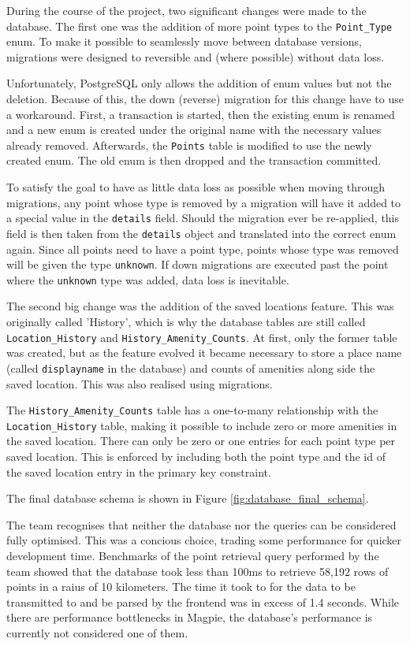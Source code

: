 During the course of the project, two significant changes were made to the
database. The first one was the addition of more point types to the
\texttt{Point\_Type} enum. To make it possible to seamlessly move between
database versions, migrations were designed to reversible and (where possible)
without data loss.

Unfortunately, PostgreSQL only allows the addition of enum values but not the
deletion. Because of this, the down (reverse) migration for this change have to
use a workaround. First, a transaction is started, then the existing enum is
renamed and a new enum is created under the original name with the necessary
values already removed. Afterwards, the \texttt{Points} table is modified to use
the newly created enum. The old enum is then dropped and the transaction
committed.

To satisfy the goal to have as little data loss as possible when moving through
migrations, any point whose type is removed by a migration will have it added to
a special value in the \texttt{details} field. Should the migration ever be
re-applied, this field is then taken from the \texttt{details} object and
translated into the correct enum again. Since all points need to have a point
type, points whose type was removed will be given the type \texttt{unknown}. If
down migrations are executed past the point where the \texttt{unknown} type was
added, data loss is inevitable.

The second big change was the addition of the saved locations feature. This was
originally called 'History', which is why the database tables are still called
\texttt{Location\_History} and \texttt{History\_Amenity\_Counts}. At first, only
the former table was created, but as the feature evolved it became necessary to
store a place name (called \texttt{displayname} in the database) and counts of
amenities along side the saved location. This was also realised using migrations.

The \texttt{History\_Amenity\_Counts} table has a one-to-many relationship with
the \texttt{Location\_History} table, making it possible to include zero or more
amenities in the saved location. There can only be zero or one entries for each
point type per saved location. This is enforced by including both the point type
and the id of the saved location entry in the primary key constraint.

The final database schema is shown in Figure \ref{fig:database_final_schema}.

The team recognises that neither the database nor the queries can be considered
fully optimised. This was a concious choice, trading some performance for
quicker development time. Benchmarks of the point retrieval query performed by
the team showed that the database took less than 100ms to retrieve 58,192 rows
of points in a raius of 10 kilometers. The time it took to for the data to be
transmitted to and be parsed by the frontend was in excess of 1.4 seconds. While
there are performance bottlenecks in Magpie, the database's performance is
currently not considered one of them.

